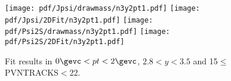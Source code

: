 \begin{figure}[H]
\begin{center}
\texttt{[image: pdf/Jpsi/drawmass/n3y2pt1.pdf]}
\texttt{[image: pdf/Jpsi/2DFit/n3y2pt1.pdf]}
\vspace*{-0.5cm}
\texttt{[image: pdf/Psi2S/drawmass/n3y2pt1.pdf]}
\texttt{[image: pdf/Psi2S/2DFit/n3y2pt1.pdf]}
\vspace*{-0.5cm}
\end{center}
\caption{Fit results in $0\gevc<pt<2\gevc$, $2.8<y<3.5$ and 15$\leq$PVNTRACKS$<$22.}
\label{Fitn3y2pt1}
\end{figure}
